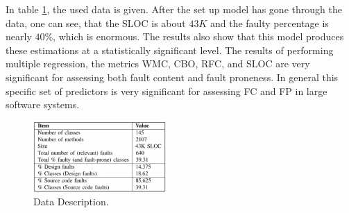 In table \ref{fig3bn}, the used data is given. After the set up model has gone through the data, one can see, that the SLOC is about $43K$ and the faulty percentage is nearly $40\%$, which is enormous. 
The results also show that this model produces these estimations at a statistically significant level. The results of performing multiple regression, the metrics WMC, CBO, RFC, and SLOC are very significant for assessing both fault content and fault proneness. In general this specific set of predictors is very significant for assessing FC and FP in large software systems.

\begin{figure}[htbp]
	\centerline{\includegraphics[width=0.45\textwidth]{pictures/tableBN.png}}
	\caption{Data Description.}
	\label{fig3bn}
\end{figure}